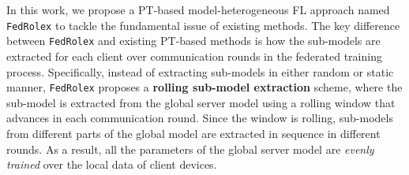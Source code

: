 \documentclass{article}
\begin{document}
In this work, we propose a PT-based model-heterogeneous FL approach named \texttt{FedRolex} to tackle the fundamental issue of existing methods.
%
The key difference between \texttt{FedRolex} and existing PT-based methods is how the sub-models are extracted for each client over communication rounds in the federated training process.
%
Specifically, instead of extracting sub-models in either random or static manner, \texttt{FedRolex} proposes a \textbf{rolling sub-model extraction} scheme, where the sub-model is extracted from the global server model using a rolling window that advances in each communication round. Since the  window is rolling, sub-models from different parts of the global model are extracted in sequence in different rounds. As a result, all the parameters of the global server model are \textit{evenly trained} over the local data of client devices.
\end{document}
